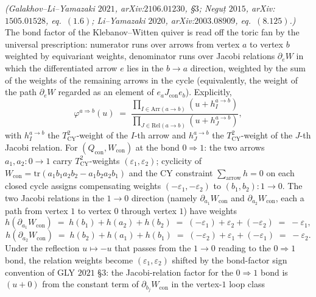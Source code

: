 \begin{proposition}
\label{prop:conifold-bond-factor-fan}
\emph{(Galakhov--Li--Yamazaki $2021$,
arXiv:$2106.01230$, \S$3$; Neguț $2015$, arXiv:$1505.01528$, eq.~$(1.6)$;
Li--Yamazaki $2020$, arXiv:$2003.08909$, eq.~$(8.125)$.)}
The bond factor of the Klebanov--Witten quiver is read off the toric
fan by the universal prescription: numerator runs over arrows from
vertex $a$ to vertex $b$ weighted by equivariant weights, denominator
runs over Jacobi relations $\partial_e W$ in which the differentiated
arrow $e$ lies in the $b \to a$ direction, weighted by the sum of the
weights of the remaining arrows in the cycle (equivalently, the weight
of the path $\partial_e W$ regarded as an element of $e_a J_{\mathrm{con}} e_b$).
Explicitly,
\begin{equation}
\label{eq:gly-bond-general}
 \varphi^{a \Rightarrow b}(u)
 \;=\;
 \frac{\prod_{I \in \mathrm{Arr}(a \to b)} (u + h^{a \to b}_I)}{\prod_{J \in \mathrm{Rel}(a \to b)} (u + h^{a \to b}_J)},
\end{equation}
with $h^{a \to b}_I$ the $T^2_{\mathrm{CY}}$-weight of the $I$-th arrow
and $h^{a \to b}_J$ the $T^2_{\mathrm{CY}}$-weight of the $J$-th
Jacobi relation. For $(Q_{\mathrm{con}}, W_{\mathrm{con}})$ at the
bond $0 \Rightarrow 1$: the two arrows $a_1, a_2 \colon 0 \to 1$ carry
$T^2_{\mathrm{CY}}$-weights $(\varepsilon_1, \varepsilon_2)$;
cyclicity of $W_{\mathrm{con}} = \mathrm{tr}(a_1 b_1 a_2 b_2 - a_1 b_2 a_2 b_1)$
and the CY constraint $\sum_{\mathrm{arrow}} h = 0$ on each closed cycle
assigns compensating weights $(-\varepsilon_1, -\varepsilon_2)$ to
$(b_1, b_2) \colon 1 \to 0$. The two Jacobi relations in the $1 \to 0$
direction (namely $\partial_{a_1} W_{\mathrm{con}}$ and $\partial_{a_2} W_{\mathrm{con}}$,
each a path from vertex $1$ to vertex $0$ through vertex $1$) have
weights
\[
 h(\partial_{a_1} W_{\mathrm{con}})
 \;=\; h(b_1) + h(a_2) + h(b_2) \;=\; (-\varepsilon_1) + \varepsilon_2 + (-\varepsilon_2) \;=\; -\varepsilon_1,
\]
\[
 h(\partial_{a_2} W_{\mathrm{con}})
 \;=\; h(b_2) + h(a_1) + h(b_1) \;=\; (-\varepsilon_2) + \varepsilon_1 + (-\varepsilon_1) \;=\; -\varepsilon_2.
\]
Under the reflection $u \mapsto -u$ that passes from the $1 \to 0$
reading to the $0 \Rightarrow 1$ bond, the relation weights become
$(\varepsilon_1, \varepsilon_2)$ shifted by the bond-factor sign
convention of GLY $2021$ \S$3$: the Jacobi-relation factor for the
$0 \Rightarrow 1$ bond is $(u + 0)$ from the constant term of
$\partial_{b_j} W_{\mathrm{con}}$ in the vertex-$1$ loop class

\end{proposition}
